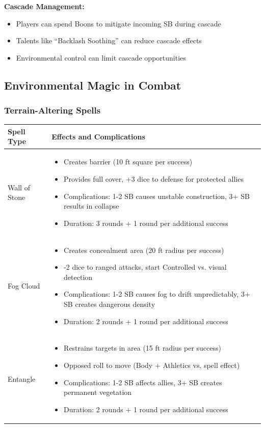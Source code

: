 \documentclass[11pt,letterpaper]{article}
\begin{document}
\textbf{Cascade Management:}
\begin{itemize}[leftmargin=*]
    \item Players can spend Boons to mitigate incoming SB during cascade
    \item Talents like ``Backlash Soothing'' can reduce cascade effects
    \item Environmental control can limit cascade opportunities
\end{itemize}

\subsection{Environmental Magic in Combat}

\subsubsection{Terrain-Altering Spells}

\begin{longtable}{|>{\raggedright\arraybackslash}p{4cm}|>{\raggedright\arraybackslash}p{8cm}|}
\hline
\textbf{Spell Type} & \textbf{Effects and Complications} \\
\hline
Wall of Stone & 
\begin{itemize}
    \item Creates barrier (10 ft square per success)
    \item Provides full cover, +3 dice to defense for protected allies
    \item Complications: 1-2 SB causes unstable construction, 3+ SB results in collapse
    \item Duration: 3 rounds + 1 round per additional success
\end{itemize} \\
\hline
Fog Cloud & 
\begin{itemize}
    \item Creates concealment area (20 ft radius per success)
    \item -2 dice to ranged attacks, start Controlled vs. visual detection
    \item Complications: 1-2 SB causes fog to drift unpredictably, 3+ SB creates dangerous density
    \item Duration: 2 rounds + 1 round per additional success
\end{itemize} \\
\hline
Entangle & 
\begin{itemize}
    \item Restrains targets in area (15 ft radius per success)
    \item Opposed roll to move (Body + Athletics vs. spell effect)
    \item Complications: 1-2 SB affects allies, 3+ SB creates permanent vegetation
    \item Duration: 2 rounds + 1 round per additional success
\end{itemize} \\
\hline
\end{longtable}
\end{document}
